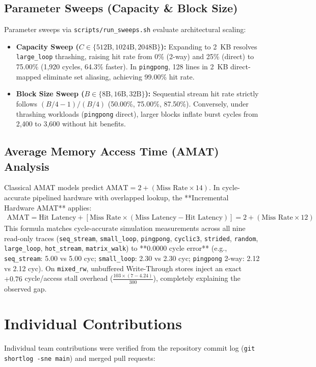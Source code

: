 \documentclass[journal,10pt,twocolumn]{IEEEtran}
\begin{document}
\subsection{Parameter Sweeps (Capacity \& Block Size)}
Parameter sweeps via \texttt{scripts/run\_sweeps.sh} evaluate architectural scaling:
\begin{itemize}
    \item \textbf{Capacity Sweep ($C \in \{512\text{B}, 1024\text{B}, 2048\text{B}\}$):} Expanding to 2~KB resolves \texttt{large\_loop} thrashing, raising hit rate from 0\% (2-way) and 25\% (direct) to 75.00\% (1,920 cycles, 64.3\% faster). In \texttt{pingpong}, 128 lines in 2~KB direct-mapped eliminate set aliasing, achieving 99.00\% hit rate.
    \item \textbf{Block Size Sweep ($B \in \{8\text{B}, 16\text{B}, 32\text{B}\}$):} Sequential stream hit rate strictly follows $(B/4 - 1)/(B/4)$ (50.00\%, 75.00\%, 87.50\%). Conversely, under thrashing workloads (\texttt{pingpong} direct), larger blocks inflate burst cycles from 2,400 to 3,600 without hit benefits.
\end{itemize}

\subsection{Average Memory Access Time (AMAT) Analysis}
Classical AMAT models predict $\text{AMAT} = 2 + (\text{Miss Rate} \times 14)$. In cycle-accurate pipelined hardware with overlapped lookup, the **Incremental Hardware AMAT** applies:
\begin{align*}
    \text{AMAT} = \text{Hit Latency} + [\text{Miss Rate} \times (\text{Miss Latency} - \text{Hit Latency})] = 2 + (\text{Miss Rate} \times 12)
\end{align*}
This formula matches cycle-accurate simulation measurements across all nine read-only traces (\texttt{seq\_stream}, \texttt{small\_loop}, \texttt{pingpong}, \texttt{cyclic3}, \texttt{strided}, \texttt{random}, \texttt{large\_loop}, \texttt{hot\_stream}, \texttt{matrix\_walk}) to **0.0000 cycle error** (e.g., \texttt{seq\_stream}: 5.00 vs 5.00 cyc; \texttt{small\_loop}: 2.30 vs 2.30 cyc; \texttt{pingpong} 2-way: 2.12 vs 2.12 cyc). On \texttt{mixed\_rw}, unbuffered Write-Through stores inject an exact $+0.76$ cycle/access stall overhead ($\frac{103 \times (7 - 4.24)}{300}$), completely explaining the observed gap.

\section{Individual Contributions}
Individual team contributions were verified from the repository commit log (\texttt{git shortlog -sne main}) and merged pull requests:
\end{document}
